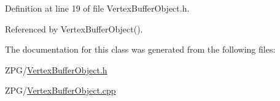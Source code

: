Definition at line 19 of file Vertex\+Buffer\+Object.\+h.



Referenced by Vertex\+Buffer\+Object().



The documentation for this class was generated from the following files\+:\begin{DoxyCompactItemize}
\item 
Z\+P\+G/\mbox{\hyperlink{VertexBufferObject_8h}{Vertex\+Buffer\+Object.\+h}}\item 
Z\+P\+G/\mbox{\hyperlink{VertexBufferObject_8cpp}{Vertex\+Buffer\+Object.\+cpp}}\end{DoxyCompactItemize}
